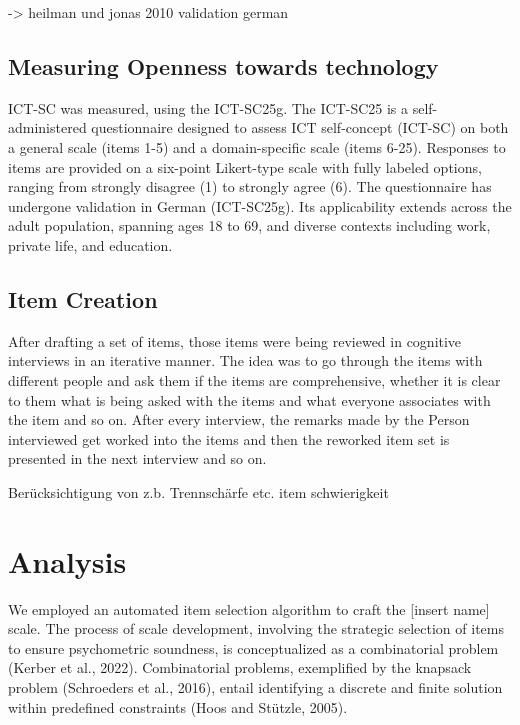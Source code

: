 \documentclass[
  12pt,
  a4paper,
  twoside]{article}
\begin{document}
-\textgreater{} heilman und jonas 2010 validation german

\hypertarget{measuring-openness-towards-technology}{%
\subsection{Measuring Openness towards technology}\label{measuring-openness-towards-technology}}

ICT-SC was measured, using the ICT-SC25g. The ICT-SC25 is a self-administered questionnaire designed to assess ICT self-concept (ICT-SC) on both a general scale (items 1-5) and a domain-specific scale (items 6-25). Responses to items are provided on a six-point Likert-type scale with fully labeled options, ranging from strongly disagree (1) to strongly agree (6). The questionnaire has undergone validation in German (ICT-SC25g). Its applicability extends across the adult population, spanning ages 18 to 69, and diverse contexts including work, private life, and education.

\hypertarget{item-creation}{%
\subsection{Item Creation}\label{item-creation}}

After drafting a set of items, those items were being reviewed in cognitive interviews in an iterative manner. The idea was to go through the items with different people and ask them if the items are comprehensive, whether it is clear to them what is being asked with the items and what everyone associates with the item and so on. After every interview, the remarks made by the Person interviewed get worked into the items and then the reworked item set is presented in the next interview and so on.

Berücksichtigung von z.b. Trennschärfe etc. item schwierigkeit

\hypertarget{analysis}{%
\section{Analysis}\label{analysis}}

We employed an automated item selection algorithm to craft the {[}insert name{]} scale. The process of scale development, involving the strategic selection of items to ensure psychometric soundness, is conceptualized as a combinatorial problem (Kerber et al., 2022). Combinatorial problems, exemplified by the knapsack problem (Schroeders et al., 2016), entail identifying a discrete and finite solution within predefined constraints (Hoos and Stützle, 2005).
\end{document}
